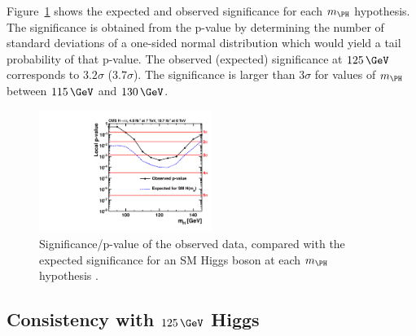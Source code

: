 Figure~\ref{fig:results-pvalue} shows the expected and observed significance for
each $m_{\PH}$ hypothesis. The significance is obtained from the p-value by
determining the number of standard deviations of a one-sided normal distribution
which would yield a tail probability of that p-value. The observed (expected)
significance at $125\,\GeV$ corresponds to $3.2\sigma$ ($3.7\sigma$). The
significance is larger than $3\sigma$ for values of $m_{\PH}$ between $115\,\GeV$
and $130\,\GeV$.

\begin{figure}[h!]
\includegraphics[width=0.5\textwidth]{plots/htt-sm/cmb_p-value.pdf}
\caption[Significance/p-value of the observed data, compared with the expected
significance for an SM Higgs boson at each $m_{\PH}$ hypothesis.]
{Significance/p-value of the observed data, compared with the expected
significance for an \ac{SM} Higgs boson at each $m_{\PH}$ hypothesis
\cite{HIG-13-004}.}
\label{fig:results-pvalue}
\end{figure}

\subsection{Consistency with $125\,\GeV$ Higgs}
\label{sec:consistency}

